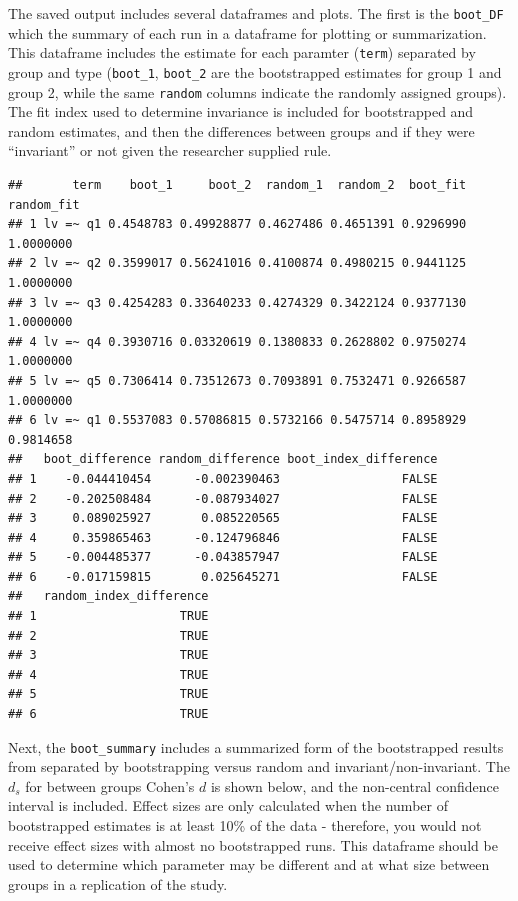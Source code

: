 \documentclass[
  man,floatsintext]{apa7}
\newenvironment{Shaded}{\begin{snugshade}}{\end{snugshade}}
\newcommand{\FunctionTok}[1]{\textcolor[rgb]{0.13,0.29,0.53}{\textbf{#1}}}
\newcommand{\NormalTok}[1]{#1}
\newcommand{\SpecialCharTok}[1]{\textcolor[rgb]{0.81,0.36,0.00}{\textbf{#1}}}
\begin{document}
The saved output includes several dataframes and plots. The first is the \texttt{boot\_DF} which the summary of each run in a dataframe for plotting or summarization. This dataframe includes the estimate for each paramter (\texttt{term}) separated by group and type (\texttt{boot\_1}, \texttt{boot\_2} are the bootstrapped estimates for group 1 and group 2, while the same \texttt{random} columns indicate the randomly assigned groups). The fit index used to determine invariance is included for bootstrapped and random estimates, and then the differences between groups and if they were ``invariant'' or not given the researcher supplied rule.

\small

\begin{Shaded}
\end{Shaded}

\normalsize

\begin{verbatim}
##       term    boot_1     boot_2  random_1  random_2  boot_fit random_fit
## 1 lv =~ q1 0.4548783 0.49928877 0.4627486 0.4651391 0.9296990  1.0000000
## 2 lv =~ q2 0.3599017 0.56241016 0.4100874 0.4980215 0.9441125  1.0000000
## 3 lv =~ q3 0.4254283 0.33640233 0.4274329 0.3422124 0.9377130  1.0000000
## 4 lv =~ q4 0.3930716 0.03320619 0.1380833 0.2628802 0.9750274  1.0000000
## 5 lv =~ q5 0.7306414 0.73512673 0.7093891 0.7532471 0.9266587  1.0000000
## 6 lv =~ q1 0.5537083 0.57086815 0.5732166 0.5475714 0.8958929  0.9814658
##   boot_difference random_difference boot_index_difference
## 1    -0.044410454      -0.002390463                 FALSE
## 2    -0.202508484      -0.087934027                 FALSE
## 3     0.089025927       0.085220565                 FALSE
## 4     0.359865463      -0.124796846                 FALSE
## 5    -0.004485377      -0.043857947                 FALSE
## 6    -0.017159815       0.025645271                 FALSE
##   random_index_difference
## 1                    TRUE
## 2                    TRUE
## 3                    TRUE
## 4                    TRUE
## 5                    TRUE
## 6                    TRUE
\end{verbatim}

Next, the \texttt{boot\_summary} includes a summarized form of the bootstrapped results from separated by bootstrapping versus random and invariant/non-invariant. The \(d_s\) for between groups Cohen's \(d\) is shown below, and the non-central confidence interval is included. Effect sizes are only calculated when the number of bootstrapped estimates is at least 10\% of the data - therefore, you would not receive effect sizes with almost no bootstrapped runs. This dataframe should be used to determine which parameter may be different and at what size between groups in a replication of the study.
\end{document}
